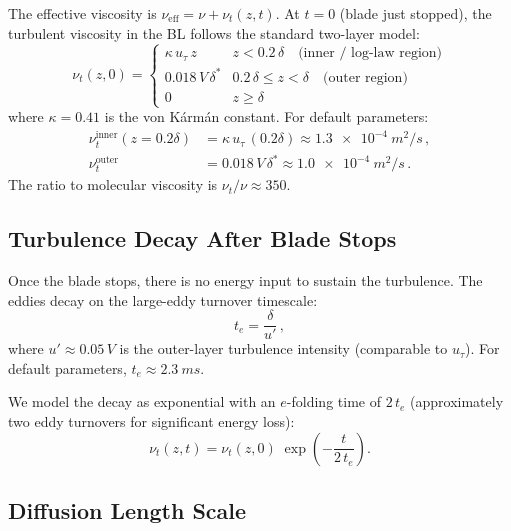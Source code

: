 \documentclass[11pt,a4paper]{article}
\begin{document}
The effective viscosity is $\nu_\mathrm{eff} = \nu + \nu_t(z,t)$.
At $t = 0$ (blade just stopped), the turbulent viscosity in the BL
follows the standard two-layer model:
\begin{equation}
  \nu_t(z, 0) =
  \begin{cases}
    \kappa\, u_\tau\, z & z < 0.2\,\delta
      \quad\text{(inner / log-law region)} \\
    0.018\, V\, \delta^* & 0.2\,\delta \le z < \delta
      \quad\text{(outer region)} \\
    0 & z \ge \delta
  \end{cases}
  \label{eq:nut_profile}
\end{equation}
where $\kappa = 0.41$ is the von K\'arm\'an constant. For default
parameters:
\begin{align}
  \nu_t^\mathrm{inner}(z = 0.2\delta)
    &= \kappa\, u_\tau\,(0.2\delta)
    \approx \SI{1.3e-4}{m^2/s}\,,
    \label{eq:nut_inner}
  \\
  \nu_t^\mathrm{outer}
    &= 0.018\, V\, \delta^*
    \approx \SI{1.0e-4}{m^2/s}\,.
    \label{eq:nut_outer}
\end{align}
The ratio to molecular viscosity is
$\nu_t / \nu \approx 350$.

\subsection{Turbulence Decay After Blade Stops}

Once the blade stops, there is no energy input to sustain the
turbulence. The eddies decay on the large-eddy turnover timescale:
\begin{equation}
  t_e = \frac{\delta}{u'}\,,
  \label{eq:teddy}
\end{equation}
where $u' \approx 0.05\,V$ is the outer-layer turbulence intensity
(comparable to $u_\tau$). For default parameters,
$t_e \approx \SI{2.3}{ms}$.

We model the decay as exponential with an $e$-folding time of
$2\,t_e$ (approximately two eddy turnovers for significant energy
loss):
\begin{equation}
  \nu_t(z,t) = \nu_t(z,0)\;\exp\!\left(-\frac{t}{2\,t_e}\right).
  \label{eq:nut_decay}
\end{equation}

\subsection{Diffusion Length Scale}
\end{document}
